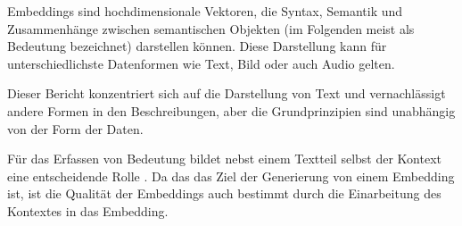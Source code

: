 \documentclass[../main.tex]{subfiles}
\begin{document}
Embeddings sind hochdimensionale Vektoren, die Syntax, Semantik und Zusammenhänge zwischen semantischen Objekten (im Folgenden meist als Bedeutung bezeichnet) darstellen können.
Diese Darstellung kann für unterschiedlichste Datenformen wie Text, Bild oder auch Audio gelten.
\cite{mikolov2013efficient}

Dieser Bericht konzentriert sich auf die Darstellung von Text und vernachlässigt andere Formen in den Beschreibungen, aber die Grundprinzipien sind unabhängig von der Form der Daten.

Für das Erfassen von Bedeutung bildet nebst einem Textteil selbst der Kontext eine entscheidende Rolle \cite{rubenstein1965contextual}.
Da das das Ziel der Generierung von einem Embedding ist, ist die Qualität der Embeddings auch bestimmt durch die Einarbeitung des Kontextes in das Embedding.
\cite{huang-etal-2012-improving}
\end{document}
